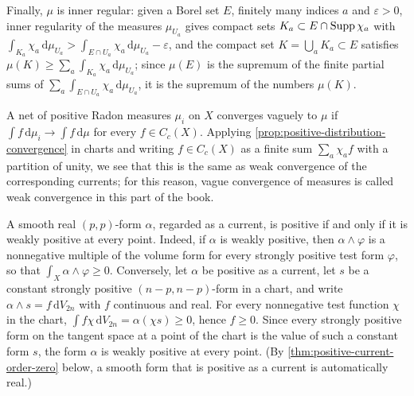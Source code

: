 Finally, $\mu$ is inner regular: given a Borel set $E$, finitely many indices $a$ and $\varepsilon>0$, inner regularity of the measures $\mu_{U_a}$ gives compact sets $K_a\subset E\cap\operatorname{Supp}\chi_a$ with $\int_{K_a}\chi_a\,\mathrm d\mu_{U_a}>\int_{E\cap U_a}\chi_a\,\mathrm d\mu_{U_a}-\varepsilon$, and the compact set $K=\bigcup_aK_a\subset E$ satisfies $\mu(K)\geq\sum_a\int_{K_a}\chi_a\,\mathrm d\mu_{U_a}$; since $\mu(E)$ is the supremum of the finite partial sums of $\sum_a\int_{E\cap U_a}\chi_a\,\mathrm d\mu_{U_a}$, it is the supremum of the numbers $\mu(K)$.

A net of positive Radon measures $\mu_i$ on $X$ converges vaguely to $\mu$ if $\int f\,\mathrm d\mu_i\to\int f\,\mathrm d\mu$ for every $f\in C_c(X)$. Applying \cref{prop:positive-distribution-convergence} in charts and writing $f\in C_c(X)$ as a finite sum $\sum_a\chi_af$ with a partition of unity, we see that this is the same as weak convergence of the corresponding currents; for this reason, vague convergence of measures is called weak convergence in this part of the book.

A smooth real $(p,p)$-form $\alpha$, regarded as a current, is positive if and only if it is weakly positive at every point. Indeed, if $\alpha$ is weakly positive, then $\alpha\wedge\varphi$ is a nonnegative multiple of the volume form for every strongly positive test form $\varphi$, so that $\int_X\alpha\wedge\varphi\geq0$. Conversely, let $\alpha$ be positive as a current, let $s$ be a constant strongly positive $(n-p,n-p)$-form in a chart, and write $\alpha\wedge s=f\,\mathrm dV_{2n}$ with $f$ continuous and real. For every nonnegative test function $\chi$ in the chart, $\int f\chi\,\mathrm dV_{2n}=\alpha(\chi s)\geq0$, hence $f\geq0$. Since every strongly positive form on the tangent space at a point of the chart is the value of such a constant form $s$, the form $\alpha$ is weakly positive at every point. (By \cref{thm:positive-current-order-zero} below, a smooth form that is positive as a current is automatically real.)

